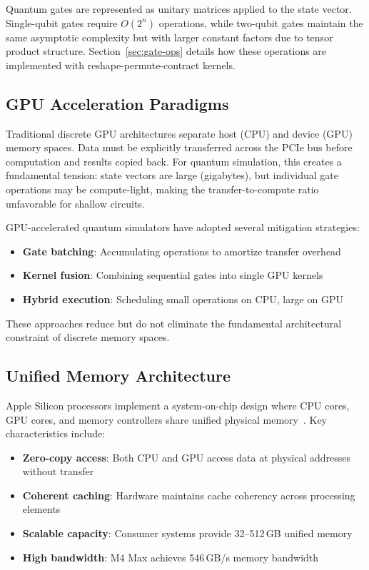 \documentclass[runningheads]{llncs}
\begin{document}
Quantum gates are represented as unitary matrices applied to the state vector. Single-qubit gates require $O(2^n)$ operations, while two-qubit gates maintain the same asymptotic complexity but with larger constant factors due to tensor product structure. Section~\ref{sec:gate-ops} details how these operations are implemented with reshape-permute-contract kernels.

\subsection{GPU Acceleration Paradigms}

Traditional discrete GPU architectures separate host (CPU) and device (GPU) memory spaces. Data must be explicitly transferred across the PCIe bus before computation and results copied back. For quantum simulation, this creates a fundamental tension: state vectors are large (gigabytes), but individual gate operations may be compute-light, making the transfer-to-compute ratio unfavorable for shallow circuits.

GPU-accelerated quantum simulators have adopted several mitigation strategies:
\begin{itemize}
    \item \textbf{Gate batching}: Accumulating operations to amortize transfer overhead~\cite{cuQuantum2023}
    \item \textbf{Kernel fusion}: Combining sequential gates into single GPU kernels~\cite{Qsim}
    \item \textbf{Hybrid execution}: Scheduling small operations on CPU, large on GPU~\cite{QuEST}
\end{itemize}

These approaches reduce but do not eliminate the fundamental architectural constraint of discrete memory spaces.

\subsection{Unified Memory Architecture}

Apple Silicon processors implement a system-on-chip design where CPU cores, GPU cores, and memory controllers share unified physical memory~\cite{UnifiedMemory2024}. Key characteristics include:
\begin{itemize}
    \item \textbf{Zero-copy access}: Both CPU and GPU access data at physical addresses without transfer
    \item \textbf{Coherent caching}: Hardware maintains cache coherency across processing elements
    \item \textbf{Scalable capacity}: Consumer systems provide 32--512\,GB unified memory
    \item \textbf{High bandwidth}: M4 Max achieves 546\,GB/s memory bandwidth~\cite{Apple2024M4}
\end{itemize}
\end{document}
